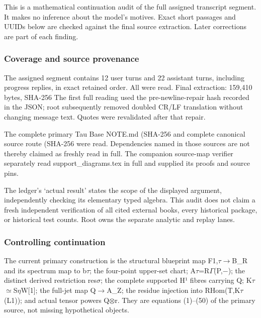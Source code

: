 This is a mathematical continuation audit of the full assigned
transcript segment. It makes no inference about the model's motives.
Exact short passages and UUIDs below are checked against the final
source extraction. Later corrections are part of each finding.

\subsubsection{Coverage and source
provenance}\label{coverage-and-source-provenance}

The assigned segment contains 12 user turns and 22 assistant turns,
including progress replies, in exact retained order. All were read.
Final extraction: 159,410 bytes, SHA-256
\protect{}
The first full reading used the pre-newline-repair hash recorded in the
JSON; root subsequently removed doubled CR/LF translation without
changing message text. Quotes were revalidated after that repair.

The complete primary Tau Base NOTE.md (SHA-256
\protect{}
and complete canonical source route (SHA-256
\protect{}
were read. Dependencies named in those sources are not thereby claimed
as freshly read in full. The companion source-map verifier separately
read support\_diagrams.tex in full and supplied its proofs and source
pins.

The ledger's `actual result' states the scope of the displayed argument,
independently checking its elementary typed algebra. This audit does not
claim a fresh independent verification of all cited external books,
every historical package, or historical test counts. Root owns the
separate analytic and replay lanes.

\subsubsection{Controlling continuation}\label{controlling-continuation}

The current primary construction is the structural blueprint map
F1,\allowbreak{}\ensuremath{τ}\allowbreak{}\allowbreak{}\ensuremath{→}\allowbreak{}B\_R
and its spectrum map to b\allowbreak{}\ensuremath{τ}\allowbreak{}; the
four-point upper-set chart;
A\allowbreak{}\ensuremath{τ}\allowbreak{}=R\allowbreak{}\ensuremath{Γ}\allowbreak{}(P,\allowbreak{}\ensuremath{−}\allowbreak{});
the distinct derived restriction
res\allowbreak{}\ensuremath{σ}\allowbreak{}; the complete supported H¹
fibres carrying Q;
K\allowbreak{}\ensuremath{τ}\allowbreak{}\allowbreak{}\ensuremath{≃}\allowbreak{}S\allowbreak{}\ensuremath{η}\allowbreak{}W[1];
the full-jet map Q\allowbreak{}\ensuremath{→}\allowbreak{}A\_Z; the
residue injection into
RHom(T,K\allowbreak{}\ensuremath{τ}\allowbreak{}(L1)); and actual tensor
powers Q\allowbreak{}\ensuremath{⊗}\allowbreak{}r. They are equations
(1)--(50) of the primary source, not missing hypothetical objects.

